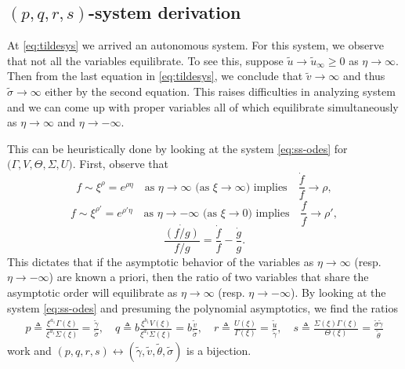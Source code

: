 \documentclass[a4paper,11pt]{article}
\def\tg{{\tilde{\gamma}}}
\def\tv{{\tilde{v}}}
\def\tth{{\tilde{\theta}}}
\def\ts{{\tilde{\sigma}}}
\def\tu{{\tilde{u}}}
\theoremstyle{remark}
\begin{document}
\subsection{$(p,q,r,s)$-system derivation}
At \eqref{eq:tildesys} we arrived  an autonomous system. For this system, we observe that not all the variables equilibrate. To see this, suppose $\tu \rightarrow \tu_\infty\ge0$ as $\eta \rightarrow \infty$. Then from the last equation in \eqref{eq:tildesys}, we conclude that $\tv \rightarrow \infty$ and thus $\ts \rightarrow \infty$ either by the second equation. This raises difficulties in analyzing system and we can come up with proper variables all of which equilibrate simultaneously as $\eta \rightarrow \infty$ and $\eta \rightarrow -\infty$.

This can be heuristically done by looking at the system \eqref{eq:ss-odes} for $\big(\Gamma,V,\Theta,\Sigma,U)$. First, observe that
$$ f \sim \xi^\rho=e^{\rho\eta} \quad \text{as $\eta \rightarrow \infty$ (as $\xi \rightarrow \infty$) implies} \quad \frac{\dot{f}}{f} \rightarrow \rho,$$
$$ f \sim \xi^{\rho'}=e^{\rho'\eta} \quad \text{as $\eta \rightarrow -\infty$ (as $\xi \rightarrow 0$) implies} \quad \frac{\dot{f}}{f} \rightarrow \rho',$$
$$ \frac{\dot{(f/g)}}{f/g} = \frac{\dot{f}}{f} - \frac{\dot{g}}{g}. $$
This dictates that if the asymptotic behavior of the variables as $\eta \rightarrow \infty$ (resp. $\eta \rightarrow -\infty$) are known a priori, then the ratio of two variables that share the asymptotic order will equilibrate as $\eta \rightarrow \infty$ (resp. $\eta \rightarrow -\infty$). By looking at the system \eqref{eq:ss-odes} and presuming the polynomial asymptotics, we find the ratios
\begin{equation}\label{eq:pqrdef} 
 \begin{aligned}
  p \triangleq \frac{ \xi^{a_1} \Gamma(\xi)}{\xi^{d_1} \Sigma(\xi)}=\frac{\tg}{\ts}, \quad q \triangleq b\frac{ \xi^{b_1} V(\xi) }{ \xi^{d_1} \Sigma(\xi)}=b \frac{\tv}{\ts},  \quad r \triangleq \frac{ U(\xi) }{ \Gamma(\xi) } = \frac{\tu}{\tg}, \quad s \triangleq \frac{\Sigma(\xi)\Gamma(\xi)}{\Theta(\xi)} = \frac{\ts\tg}{\tth}
 \end{aligned}
\end{equation}
 work and $(p,q,r,s) \leftrightarrow (\tg,\tv, \tth,\ts)$ is a bijection.
\end{document}
